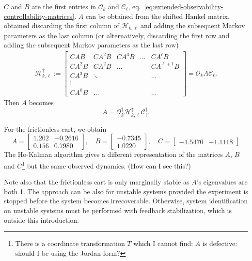 $C$ and $B$ are the first entries in $\mathcal{O}_k$ and $\mathcal{C}_\ell$, eq.~\eqref{eq:extended-observability-controllability-matrices}. $A$ can be obtained from the shifted Hankel matrix, obtained discarding the first column of $\mathcal{H}_{k,\ell}$ and adding the subsequent Markov parameters as the last column (or alternatively, discarding the first row and adding the subsequent Markov parameters as the last row)
\begin{align*}
  \mathcal{H}_{k,\ell}^\uparrow :=
  \begin{bmatrix}
    CAB & CA^2B & CA^3 B & \ldots & CA^\ell B \\
    CA^2B & CA^2B & \ldots & & CA^{\ell+1}B \\
    CA^3B & \ddots & & & \ldots \\
    \vdots \\
    CA^kB & \ldots & & & \ldots
  \end{bmatrix} = \mathcal{O}_k A \mathcal{C}_\ell.
\end{align*}
Then $A$ becomes
\begin{equation*}
  A = \mathcal{O}_k^\dagger\mathcal{H}_{k,\ell}^\uparrow \mathcal{C}_\ell^\dagger.
\end{equation*}

For the frictionless cart, we obtain
\begin{equation*}
  A =
  \begin{bmatrix}
    1.202 & -0.2616 \\
    0.156 &  0.7980
  \end{bmatrix},\quad B =
  \begin{bmatrix}
    -0.7345 \\
    1.0220
  \end{bmatrix},\quad C =
  \begin{bmatrix}
    -1.5470 & -1.1118
  \end{bmatrix}
\end{equation*}
The Ho-Kalman algorithm gives a different representation of the matrices $A$, $B$ and $C$\footnote{There is a coordinate transformation $T$ which I cannot find: $A$ is defective: should I be using the Jordan form?} but the same observed dynamics. (How can I see this?)

Note also that the frictionless cart is only marginally stable as $A$'s eigenvalues are both 1. The approach can be also for unstable systems provided the experiment is stopped before the system becomes irrecoverable. Otherwise, system identification on unstable systems must be performed with feedback stabilization, which is outside this introduction.

